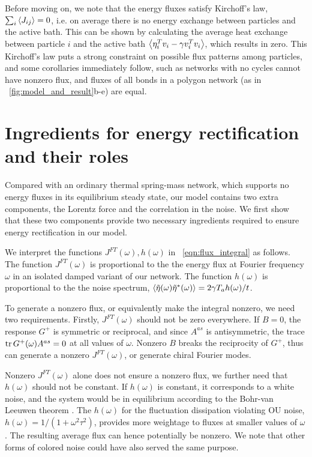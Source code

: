 \documentclass[
 preprint,
 preprintnumbers,
 amsmath,amssymb,
 aps,
 pre,
 longbibliography,
 superscriptaddress,
 10pt, twocolumn
]{revtex4-1}
\begin{document}
Before moving on, we note that the energy fluxes satisfy Kirchoff's law, $\sum_i \expval{J_{ij}} = 0$, i.e. on average there is no energy exchange between particles and the active bath. This can be shown by calculating the average heat exchange between particle $i$ and the active bath $\expval{\eta_i^T v_i - \gamma v_i^T v_i}$, which results in zero.
This Kirchoff's law puts a strong constraint on possible flux patterns among particles, and some corollaries immediately follow, such as networks with no cycles cannot have nonzero flux, and fluxes of all bonds in a polygon network (as in \figurename~\ref{fig:model_and_result}b-e) are equal.


\section{Ingredients for energy rectification and their roles} \label{sec:fourier}

Compared with an ordinary thermal spring-mass network, which supports no energy fluxes in its equilibrium steady state, our model contains two extra components, the Lorentz force and the correlation in the noise.
We first show that these two components provide two necessary ingredients required to ensure energy rectification in our model.

We interpret the functions $J^{FT}(\omega), h(\omega)$ in \eqnname~\eqref{eqn:flux_integral} as follows.
The function $J^{FT}(\omega)$ is proportional to the the energy flux at Fourier frequency $\omega$ in an isolated damped variant of our network.
The function $h(\omega)$ is proportional to the the noise spectrum, $\expval{\tilde{\eta}(\omega)\tilde{\eta}^*(\omega)} = 2\gamma T_a h(\omega) / t$.

To generate a nonzero flux, or equivalently make the integral nonzero, we need two requirements.
Firstly, $J^{FT}(\omega)$ should not be zero everywhere.
If $B=0$, the response $G^+$ is symmetric or reciprocal, and since $A^{as}$ is antisymmetric, the trace $\tr G^+(\omega) A^{as}=0$ at all values of $\omega$. Nonzero $B$ breaks the reciprocity of $G^+$, thus can generate a nonzero $J^{FT}(\omega)$, or generate chiral Fourier modes.

Nonzero $J^{FT}(\omega)$ alone does not ensure a nonzero flux, we further need that $h(\omega)$ should not be constant.
If $h(\omega)$ is constant, it corresponds to a white noise, and the system would be in equilibrium according to the Bohr-van Leeuwen theorem \cite{Pradhan2010NonexistenceClassical}.
The $h(\omega)$ for the fluctuation dissipation violating OU noise, $h(\omega)=1/(1+\omega^2\tau^2)$, provides more weightage to fluxes at smaller values of $\omega$. The resulting average flux can hence potentially be nonzero. We note that other forms of colored noise could have also served the same purpose.
\end{document}
